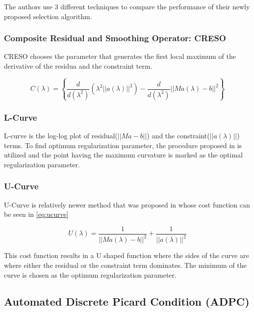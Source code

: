 \documentclass[draftcls, onecolumn, journal]{IEEEtran}
\begin{document}
The authors use 3 different techniques to compare the performance of their newly proposed selection algorithm. 

\subsubsection{Composite Residual and Smoothing Operator: CRESO}

CRESO \cite{colli1985mathematical} chooses the parameter that generates the first local maximum of the derivative of the residua and the constraint term. 

\begin{equation}
    C(\lambda) = \left\{ \frac{d}{d(\lambda^2)}(\lambda^2||a(\lambda)||^2) -  \frac{d}{d(\lambda^2)}||Ma(\lambda) - b||^2 \right\}
\end{equation}

\subsubsection{L-Curve}

L-curve is the log-log plot of residual($||Ma-b||$) and the constraint($||a(\lambda)||$) terms. To find optimum regularization parameter, the procedure proposed in \cite*{hansen1993use} is utilized and the point having the maximum curvature is marked as the optimal regularization parameter. 

\subsubsection{U-Curve}

U-Curve is relatively newer method that was proposed in \cite*{krawczyk2007regularization} whose cost function can be seen in \eqref{eq:ucurve}

\begin{equation}
    U(\lambda) = \frac{1}{||Ma(\lambda)-b||^2} + \frac{1}{||a(\lambda)||^2}
    \label{eq:ucurve}
\end{equation}

This cost function results in a U shaped function where the sides of the curve are where either the residual or the constraint term dominates. The minimum of the curve is chosen as the optimum regularization parameter. 

\newpage

\subsection{Automated Discrete Picard Condition (ADPC)}
\end{document}
